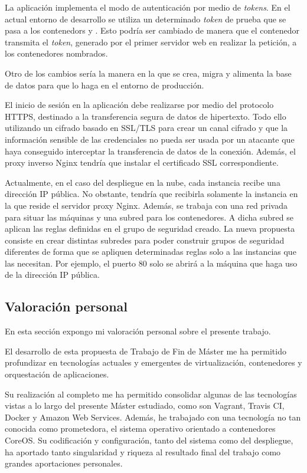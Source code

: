 La aplicación implementa el modo de autenticación por medio de \textit{tokens}. En el actual entorno de desarrollo se utiliza un determinado \textit{token} de prueba que se pasa a los contenedors  y . Esto podría ser cambiado de manera que el contenedor  transmita el \textit{token}, generado por el primer servidor web en realizar la petición, a los contenedores nombrados.

Otro de los cambios sería la manera en la que se crea, migra y alimenta la base de datos para que lo haga en el entorno de producción. 

El inicio de sesión en la aplicación debe realizarse por medio del protocolo HTTPS, destinado a la transferencia segura de datos de hipertexto. Todo ello utilizando un cifrado basado en SSL/TLS para crear un canal cifrado y que la información sensible de las credenciales no pueda ser usada por un atacante que haya conseguido interceptar la transferencia de datos de la conexión. Además, el proxy inverso Nginx tendría que instalar el certificado SSL correspondiente.

Actualmente, en el caso del despliegue en la nube, cada instancia recibe una dirección IP pública. No obstante, tendría que recibirla solamente la instancia en la que reside el servidor proxy Nginx. Además, se trabaja con una red privada para situar las máquinas y una subred para los contenedores. A dicha subred se aplican las reglas definidas en el grupo de seguridad creado. La nueva propuesta consiste en crear distintas subredes para poder construir grupos de seguridad diferentes de forma que se apliquen determinadas reglas solo a las instancias que las necesitan. Por ejemplo, el puerto 80 solo se abrirá a la máquina que haga uso de la dirección IP pública.

\subsection{Valoración personal}

En esta sección expongo mi valoración personal sobre el presente trabajo.

El desarrollo de esta propuesta de Trabajo de Fin de Máster me ha permitido profundizar en tecnologías actuales y emergentes de virtualización, contenedores y orquestación de aplicaciones.

Su realización al completo me ha permitido consolidar algunas de las tecnologías vistas a lo largo del presente Máster estudiado, como son Vagrant, Travis CI, Docker y Amazon Web Services. Además, he trabajado con una tecnología no tan conocida como prometedora, el sistema operativo orientado a contenedores CoreOS. Su codificación y configuración, tanto del sistema como del despliegue, ha aportado tanto singularidad y riqueza al resultado final del trabajo como grandes aportaciones personales.

